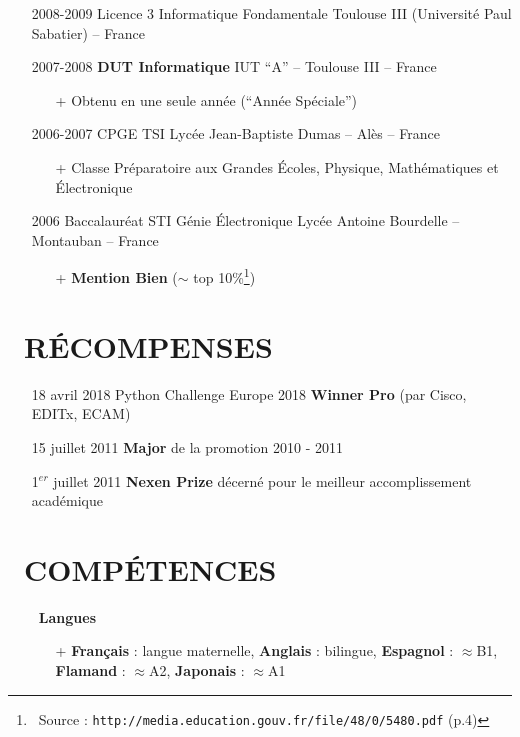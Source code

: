 \documentclass{res}
\begin{document}
\begin{resume}
\begin{itemize}
\item[] 2008-2009 \tabto{2cm} Licence 3 Informatique Fondamentale \hfill Toulouse III (Universit\'e Paul Sabatier) -- France

\item[] 2007-2008 \tabto{2cm} \textbf{DUT Informatique} \hfill IUT ``A'' -- Toulouse III -- France
	\begin{itemize}
		\item[+] Obtenu en une seule ann\'ee (``Ann\'ee Sp\'eciale'')
	\end{itemize}

\item[] 2006-2007 \tabto{2cm} CPGE TSI \hfill Lyc\'ee Jean-Baptiste Dumas -- Al\`es -- France
	\begin{itemize}
		\item[+] Classe Pr\'eparatoire aux Grandes \'Ecoles, Physique, Math\'ematiques et \'Electronique
	\end{itemize}
	
\item[] 2006 \tabto{2cm} Baccalaur\'eat STI G\'enie \'Electronique \hfill Lyc\'ee Antoine Bourdelle -- Montauban -- France
	\begin{itemize}
		\item[+] \textbf{Mention Bien} ($\sim$ top 10\%\footnote{~Source : \texttt{http://media.education.gouv.fr/file/48/0/5480.pdf} (p.4)})
	\end{itemize}
\end{itemize}


\section{\faMedal~R\'ECOMPENSES}
\begin{itemize}
	\item[] 18 avril 2018 \tabto{4cm} Python Challenge Europe 2018 \textbf{Winner Pro} (par Cisco, EDITx, ECAM)
	\item[] 15 juillet 2011 \tabto{4cm} \textbf{Major} de la promotion 2010 - 2011
	\item[] 1$^{er}$ juillet 2011 \tabto{4cm} \textbf{Nexen Prize} d\'ecern\'e pour le meilleur accomplissement acad\'emique
\end{itemize}


\section{\faLayerGroup~COMP\'ETENCES}
	\begin{itemize}
		\item[] \faLanguage~\textbf{Langues}
		\begin{itemize}
                 \item[+]  \textbf{Fran\c{c}ais} : langue maternelle, \textbf{Anglais} : bilingue, \textbf{Espagnol} : $\approx$B1, \textbf{Flamand} : $\approx$A2, \textbf{Japonais} : $\approx$A1
		\end{itemize}	
	\end{itemize}
	

\end{resume}
\end{document}
